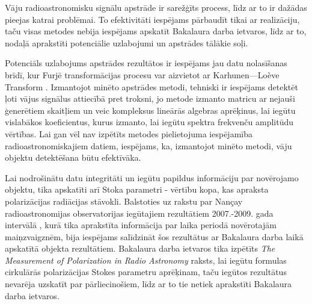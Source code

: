 Vāju radioastronomisku signālu apstrāde ir sarežģīts process, līdz ar to ir dažādas pieejas katrai problēmai. To efektivitāti iespējams pārbaudīt tikai ar realizāciju, taču visas metodes nebija iespējams apskatīt Bakalaura darba ietvaros, līdz ar to, nodaļā aprakstīti potenciālie uzlabojumi un apstrādes tālākie soļi.

Potenciāls uzlabojums apstrādes rezultātos ir iespējams jau datu nolasīšanas brīdī, kur Furjē transformācijas procesu var aizvietot ar Karhunen—Loève Transform \cite{KLT}. Izmantojot minēto apstrādes metodi, tehniski ir iespējams detektēt ļoti vājus signālus attiecībā pret troksni, jo metode izmanto matricu ar nejauši ģenerētiem skaitļiem un veic kompleksus lineārās algebras aprēķinus, lai iegūtu vislabākos koeficientus, kurus izmanto, lai iegūtu spektra frekvenču amplitūdu vērtības. Lai gan vēl nav izpētīts metodes pielietojuma iespējamība radioastronomiskajiem datiem, iespējams, ka, izmantojot minēto metodi, vāju objektu detektēšana būtu efektīvāka.

Lai nodrošinātu datu integritāti un iegūtu papildus informāciju par novērojamo objektu, tika apskatīti arī Stoka \cite{stokes-theory} parametri - vērtību kopa, kas apraksta polarizācijas radiācijas stāvokli. Balstoties uz rakstu par Nançay radioastronomijas observatorijas iegūtajiem rezultātiem 2007.-2009. gada intervālā \cite{nancay}, kurā tika aprakstīta informācija par laika periodā novērotajām maiņzvaigznēm, bija iespējams salīdzināt šos rezultātus ar Bakalaura darba laikā apskatītā objekta rezultātiem. Bakalaura darba ietvaros tika izpētīts \textit{The Measurement of Polarization in Radio Astronomy} \cite{stokes} raksts, lai iegūtu formulas cirkulārās polarizācijas Stokes parametru aprēķinam, taču iegūtos rezultātus nevarēja uzskatīt par pārliecinošiem, līdz ar to tie netiek aprakstīti Bakalaura darba ietvaros.


